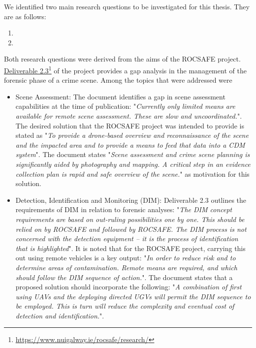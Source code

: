 We identified two main research questions to be investigated for this thesis. They are as follows:
\begin{enumerate}

    \item  
    
    \item 
    
\end{enumerate}

Both research questions were derived from the aims of the ROCSAFE project. \href{https://www.nuigalway.ie/rocsafe/research/}{Deliverable 2.3}\footnote{\href {https://www.nuigalway.ie/rocsafe/research/}{https://www.nuigalway.ie/rocsafe/research/}} of the project provides a gap analysis in the management of the forensic phase of a crime scene. 
Among the topics that were addressed were
\begin{itemize}
    \item Scene Assessment: The document identifies a gap in scene assessment capabilities at the time of publication: 
"\textit{Currently only limited means are available for remote scene assessment. These are slow and uncoordinated.}". The desired solution that the ROCSAFE project was intended to provide is stated as "\textit{To provide a drone-based overview and reconnaissance of the scene and the impacted area and to provide a means to feed that data into a CDM system}". The document states "\textit{Scene assessment and crime scene planning is significantly aided by photography and mapping.  A critical step in an evidence collection plan is rapid and safe overview of the scene.}" as motivation for this solution.

    \item Detection, Identification and Monitoring (DIM): Deliverable 2.3 outlines the requirements of DIM in relation to forensic analyses:
    "\textit{The DIM concept requirements are based on out-ruling possibilities one by one. This should be relied on by ROCSAFE and followed by ROCSAFE. The DIM process is not concerned with the detection equipment – it is the process of identification that is highlighted}". It is noted that for the ROCSAFE project, carrying this out using remote vehicles is a key output: "\textit{In order to reduce risk and to determine areas of contamination. Remote means are required, and which should follow the DIM sequence of action.}". The document states that a proposed solution should incorporate the following: "\textit{A combination of first using UAVs and the deploying directed UGVs will permit the DIM sequence to be employed. This is turn will reduce the complexity and eventual cost of detection and identification.}".
\end{itemize}


